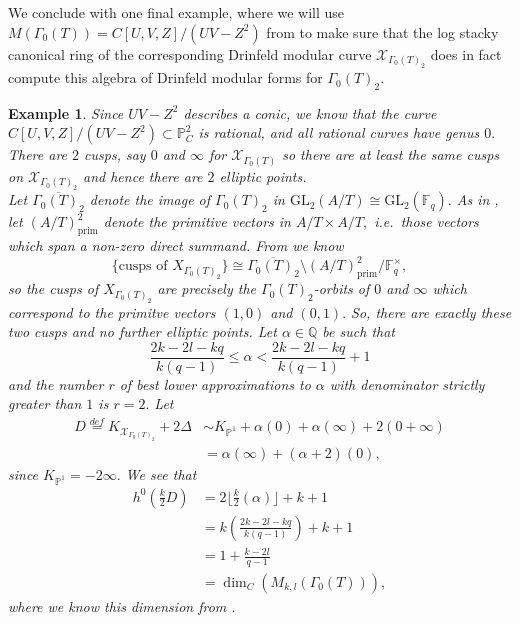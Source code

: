 \documentclass[11pt]{amsart}
\newtheorem{example}[theorem]{Example}
\theoremstyle{definition}
\numberwithin{equation}{section}
\newcommand{\GL}{\mathrm{GL}} 	%
\newcommand{\sX}{\mathscr{X}}		%
\newcommand{\bbF}{\mathbb{F}}		%
\newcommand{\bbP}{\mathbb{P}}		%
\newcommand{\bbQ}{\mathbb{Q}}		%
\begin{document}
We conclude with one final example, where we will use $M(\Gamma_0(T))=C[U,V,Z]/(UV-Z^2)$ from \cite[Theorem $4.4$]{Dalal-Kumar-Gamma_0(T)-structure} to make sure that the log stacky canonical ring of the corresponding Drinfeld modular curve $\sX_{\Gamma_0(T)_2}$ does in fact compute this algebra of Drinfeld modular forms for $\Gamma_0(T)_2.$
\begin{example}
	Since $UV-Z^2$ describes a conic, we know that the curve $C[U,V,Z]/(UV-Z^2)\subset\bbP^2_C$ is rational, and all rational curves have genus $0.$ There are $2$ cusps, say $0$ and $\infty$ for $\sX_{\Gamma_0(T)}$ so there are at least the same cusps on $\sX_{\Gamma_0(T)_2}$ and hence there are $2$ elliptic points.\\ 
	
	Let $\overline{\Gamma_0(T)_2}$ denote the image of $\Gamma_0(T)_2$ in $\GL_2(A/T)\cong \GL_2(\bbF_q).$ As in \cite[Section $3$]{Gekeler-Invariants}, let $(A/T)^2_{\text{prim}}$ denote the primitive vectors in $A/T\times A/T,$ i.e.\ those vectors which span a non-zero direct summand. From \cite[Section $3$]{Gekeler-Invariants} we know 
	\[\{\text{cusps of }X_{\Gamma_0(T)_2}\}\cong \overline{\Gamma_0(T)_2}\setminus (A/T)^2_{\text{prim}}/\bbF_q^{\times},\] so the cusps of $X_{\Gamma_0(T)_2}$ are precisely the $\Gamma_0(T)_2$-orbits of $0$ and $\infty$ which correspond to the primitve vectors $(1,0)$ and $(0,1).$ So, there are exactly these two cusps and no further elliptic points. Let $\alpha\in \bbQ$ be such that \[\frac{2k-2l-kq}{k(q-1)}\leq \alpha<\frac{2k-2l-kq}{k(q-1)}+1\] and the number $r$ of best lower approximations to $\alpha$ with denominator strictly greater than $1$ is $r=2.$ Let
	\begin{align*}
		D\overset{def}{=}K_{\sX_{\Gamma_0(T)_2}}+2\Delta&\sim K_{\bbP^1}+\alpha(0)+\alpha(\infty)+2(0+\infty)\\
		&=\alpha(\infty)+(\alpha+2)(0),
	\end{align*}
	since $K_{\bbP^1}= -2\infty.$ We see that 
	\begin{align*}
		h^0\left(\frac{k}{2}D\right)&=2\Big\lfloor\frac{k}{2}(\alpha)\Big\rfloor+k+1\\
		&=k\left(\frac{2k-2l-kq}{k(q-1)}\right)+k+1\\
		&=1+\frac{k-2l}{q-1}\\
		&=\dim_C(M_{k,l}(\Gamma_0(T))),
	\end{align*}
	where we know this dimension from \cite[Proposition $4.1$]{Dalal-Kumar-Gamma_0(T)-structure}.\\
	

\end{example}
\end{document}
